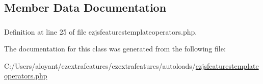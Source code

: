 \subsection{Member Data Documentation}
\hypertarget{classextension_1_1ezextrafeatures_1_1autoloads_1_1e_z_j_s_features_template_operators_a98a2d25e2dbe9c3569adb4a0e46ac0a4}{
\subsubsection[{\$\-Operators}]{}}\label{classextension_1_1ezextrafeatures_1_1autoloads_1_1e_z_j_s_features_template_operators_a98a2d25e2dbe9c3569adb4a0e46ac0a4}


Definition at line 25 of file ezjsfeaturestemplateoperators.\-php.



The documentation for this class was generated from the following file\-:\begin{DoxyCompactItemize}
\item 
C\-:/\-Users/aloyant/ezextrafeatures/ezextrafeatures/autoloads/\hyperlink{ezjsfeaturestemplateoperators_8php}{ezjsfeaturestemplateoperators.\-php}\end{DoxyCompactItemize}
